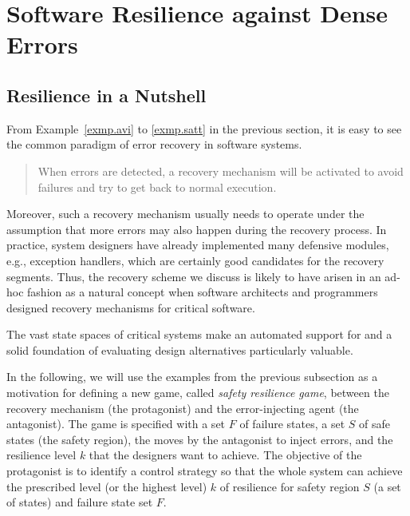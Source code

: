 \chapter{Software Resilience against Dense Errors}
\label{c:resilience}

\section{Resilience in a Nutshell}
From Example~\ref{exmp.avi} to \ref{exmp.satt} in the previous section, it is easy to see the common paradigm of error recovery in software systems.  

\begin{quote}
When errors are detected, a recovery mechanism will be activated to avoid failures and try to get back to normal execution. 
\end{quote}

Moreover, such a recovery mechanism usually needs to operate under the assumption that more errors may also happen during the recovery process.
In practice, system designers have already implemented many defensive modules, e.g., exception handlers, which are certainly good candidates for the recovery segments.  
Thus, the recovery scheme we discuss is likely to have arisen in an ad-hoc fashion as a natural concept when software architects and programmers designed recovery mechanisms for critical software.  

The vast state spaces of critical systems make an automated support for and a solid foundation of evaluating design alternatives particularly valuable. 

In the following, we will use the examples from the previous subsection as a motivation for defining a new game, called {\em safety resilience game}, between the recovery mechanism (the protagonist) and the error-injecting agent (the antagonist).  
The game is specified with a set $F$ of failure states, a set $S$ of safe states (the safety region), the moves by the antagonist to inject errors, and the resilience level $k$ that the designers want to achieve. 
The objective of the protagonist is to identify a control strategy so that the whole system can achieve the prescribed level (or the highest level) $k$ of resilience for safety region $S$ (a set of states) and failure state set $F$.  

